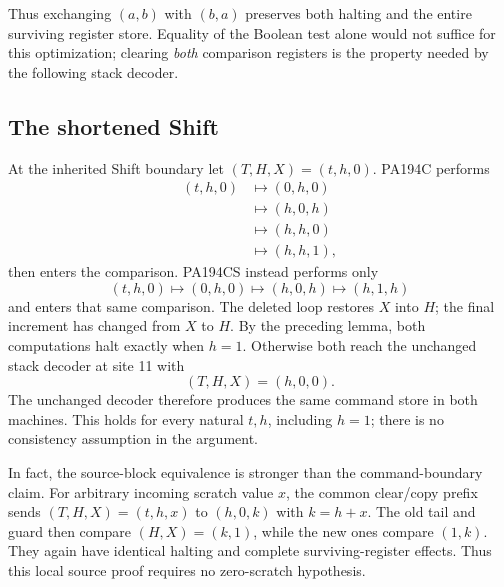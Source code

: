Thus exchanging $(a,b)$ with $(b,a)$ preserves both halting and the entire
surviving register store. Equality of the Boolean test alone would not
suffice for this optimization; clearing \emph{both} comparison registers
is the property needed by the following stack decoder.

\subsection{The shortened Shift}

At the inherited Shift boundary let $(T,H,X)=(t,h,0)$. PA194C performs
\[
\begin{aligned}
(t,h,0)&\longmapsto(0,h,0)\\
       &\longmapsto(h,0,h)\\
       &\longmapsto(h,h,0)\\
       &\longmapsto(h,h,1),
\end{aligned}
\]
then enters the comparison. PA194CS instead performs only
\[
       (t,h,0)\longmapsto(0,h,0)
          \longmapsto(h,0,h)\longmapsto(h,1,h)
\]
and enters that same comparison. The deleted loop restores $X$ into $H$;
the final increment has changed from $X$ to $H$. By the preceding lemma,
both computations halt exactly when $h=1$. Otherwise both reach the
unchanged stack decoder at site 11 with
\[
                         (T,H,X)=(h,0,0).
\]
The unchanged decoder therefore produces the same command store in both
machines. This holds for every natural $t,h$, including $h=1$; there is no
consistency assumption in the argument.

In fact, the source-block equivalence is stronger than the command-boundary
claim. For arbitrary incoming scratch value $x$, the common clear/copy
prefix sends $(T,H,X)=(t,h,x)$ to $(h,0,k)$ with $k=h+x$. The old tail
and guard then compare $(H,X)=(k,1)$, while the new ones compare
$(1,k)$. They again have identical halting and complete surviving-register
effects. Thus this local source proof requires no zero-scratch hypothesis.

